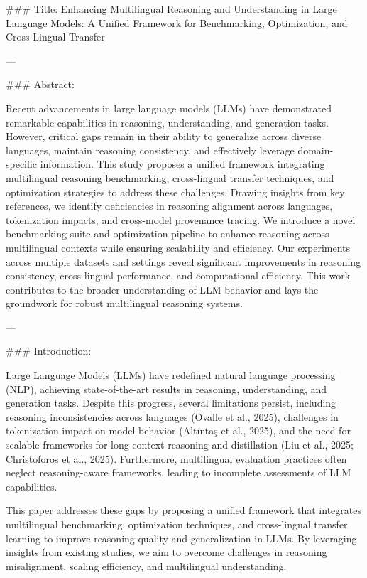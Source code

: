 ### Title: Enhancing Multilingual Reasoning and Understanding in Large Language Models: A Unified Framework for Benchmarking, Optimization, and Cross-Lingual Transfer

---

### Abstract:

Recent advancements in large language models (LLMs) have demonstrated remarkable capabilities in reasoning, understanding, and generation tasks. However, critical gaps remain in their ability to generalize across diverse languages, maintain reasoning consistency, and effectively leverage domain-specific information. This study proposes a unified framework integrating multilingual reasoning benchmarking, cross-lingual transfer techniques, and optimization strategies to address these challenges. Drawing insights from key references, we identify deficiencies in reasoning alignment across languages, tokenization impacts, and cross-model provenance tracing. We introduce a novel benchmarking suite and optimization pipeline to enhance reasoning across multilingual contexts while ensuring scalability and efficiency. Our experiments across multiple datasets and settings reveal significant improvements in reasoning consistency, cross-lingual performance, and computational efficiency. This work contributes to the broader understanding of LLM behavior and lays the groundwork for robust multilingual reasoning systems.

---

### Introduction:

Large Language Models (LLMs) have redefined natural language processing (NLP), achieving state-of-the-art results in reasoning, understanding, and generation tasks. Despite this progress, several limitations persist, including reasoning inconsistencies across languages (Ovalle et al., 2025), challenges in tokenization impact on model behavior (Altıntaş et al., 2025), and the need for scalable frameworks for long-context reasoning and distillation (Liu et al., 2025; Christoforos et al., 2025). Furthermore, multilingual evaluation practices often neglect reasoning-aware frameworks, leading to incomplete assessments of LLM capabilities.

This paper addresses these gaps by proposing a unified framework that integrates multilingual benchmarking, optimization techniques, and cross-lingual transfer learning to improve reasoning quality and generalization in LLMs. By leveraging insights from existing studies, we aim to overcome challenges in reasoning misalignment, scaling efficiency, and multilingual understanding.

